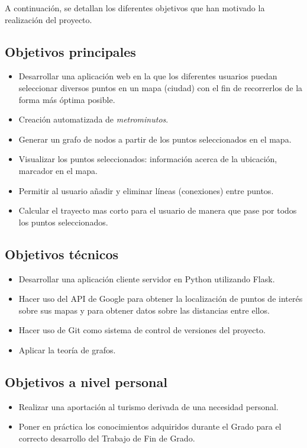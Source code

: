 
A continuación, se detallan los diferentes objetivos que han motivado la realización del proyecto.

\subsection{Objetivos principales}

\begin{itemize}
	\item Desarrollar una aplicación web en la que los diferentes usuarios puedan seleccionar diversos puntos en un mapa (ciudad) con el fin de recorrerlos de la forma más óptima posible.
	\item Creación automatizada de \textit{metrominutos}.
	\item Generar un grafo de nodos a partir de los puntos seleccionados en el mapa.
	\item Visualizar los puntos seleccionados: información acerca de la ubicación, marcador en el mapa.
	\item Permitir al usuario añadir y eliminar líneas (conexiones) entre puntos.
	\item Calcular el trayecto mas corto para el usuario de manera que pase por todos los puntos seleccionados.
\end{itemize}

\subsection{Objetivos técnicos}
\begin{itemize}
	\item Desarrollar una aplicación cliente servidor en Python utilizando Flask.
	\item Hacer uso del API de Google para obtener la localización de puntos de interés sobre sus mapas y para obtener datos sobre las distancias entre ellos.
	\item Hacer uso de Git como sistema de control de versiones del proyecto.
	\item Aplicar la teoría de grafos.
\end{itemize}
\subsection{Objetivos a nivel personal}
\begin{itemize}
	\item Realizar una aportación al turismo derivada de una necesidad personal.
	\item Poner en práctica los conocimientos adquiridos durante el Grado para el correcto desarrollo del Trabajo de Fin de Grado.
\end{itemize}
